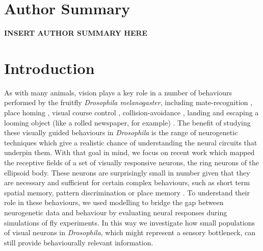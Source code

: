 \documentclass[10pt]{article}
\begin{document}
\section*{Author Summary}
{\bf INSERT AUTHOR SUMMARY HERE}

\section*{Introduction}
As with many animals, vision plays a key role in a number of behaviours performed by the fruitfly \emph{Drosophila melanogaster}, including mate-recognition \cite{Agrawal2014}, place homing \cite{Ofstad2011}, visual course control \cite{Borst2014}, collision-avoidance \cite{Tammero2002}, landing \cite{Tammero2002} and escaping a looming object (like a rolled newspaper, for example) \cite{Card2008}. The benefit of studying these visually guided behaviours in \emph{Drosophila} is the range of neurogenetic techniques which give a realistic chance of understanding the neural circuits that underpin them. With that goal in mind, we focus on recent work \cite{Seelig2013} which mapped the receptive fields of a set of visually responsive neurons, the ring neurons of the ellipsoid body. These neurons are surprisingly small in number given that they are necessary and sufficient for certain complex behaviours, such as short term spatial memory, pattern discrimination or place memory \cite{Ofstad2011,Liu2006,Neuser2008,Seelig2015}. To understand their role in these behaviours, we used modelling to bridge the gap between neurogenetic data and behaviour by evaluating neural responses during simulations of fly experiments. In this way we investigate how small populations of visual neurons in \emph{Drosophila}, which might represent a sensory bottleneck, can still provide behaviourally relevant information.
\end{document}
